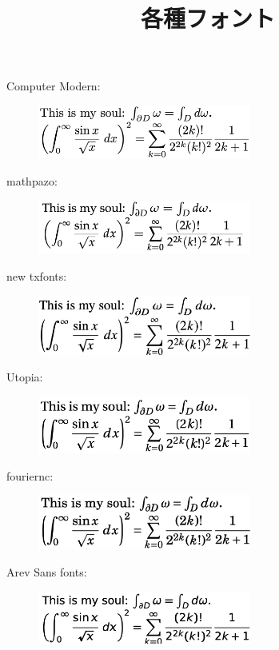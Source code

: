 \documentclass[uplatex, 12pt, dvipdfmx, twocolumn]{jsarticle}
\title{各種フォント}
\author{}
\date{}
\begin{document}
\maketitle

Computer Modern:
\begin{figure}[h]\centering
    \includegraphics[width=7cm]{CM.png}
\end{figure}

mathpazo:
\begin{figure}[h]\centering
    \includegraphics[width=7cm]{mathpazo.png}
\end{figure}

new txfonts:
\begin{figure}[h]\centering
    \includegraphics[width=7cm]{tx.png}
\end{figure}

Utopia:
\begin{figure}[h]\centering
    \includegraphics[width=7cm]{utopia.png}
\end{figure}

fouriernc:
\begin{figure}[h]\centering
    \includegraphics[width=7cm]{fnc.png}
\end{figure}

\newpage

Arev Sans fonts:
\begin{figure}[h]\centering
    \includegraphics[width=7cm]{arev.png}
\end{figure}
\end{document}
